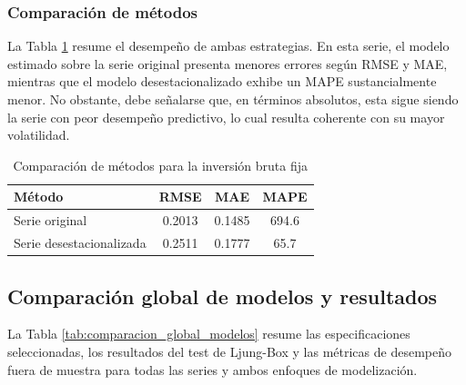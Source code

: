 \documentclass[12pt,a4paper]{article}
\begin{document}
	\subsubsection{Comparación de métodos}
	
	La Tabla \ref{tab:ibf_comparacion} resume el desempeño de ambas estrategias. En esta serie, el modelo estimado sobre la serie original presenta menores errores según RMSE y MAE, mientras que el modelo desestacionalizado exhibe un MAPE sustancialmente menor. No obstante, debe señalarse que, en términos absolutos, esta sigue siendo la serie con peor desempeño predictivo, lo cual resulta coherente con su mayor volatilidad.
	
	\begin{table}[H]
		\centering
		\caption{Comparación de métodos para la inversión bruta fija}
		\label{tab:ibf_comparacion}
		\begin{tabular}{lccc}
			\toprule
			Método & RMSE & MAE & MAPE \\
			\midrule
			Serie original & 0.2013 & 0.1485 & 694.6 \\
			Serie desestacionalizada & 0.2511 & 0.1777 & 65.7 \\
			\bottomrule
		\end{tabular}
	\end{table}
	
	\subsection{Comparación global de modelos y resultados}
	
	La Tabla \ref{tab:comparacion_global_modelos} resume las especificaciones seleccionadas, los resultados del test de Ljung-Box y las métricas de desempeño fuera de muestra para todas las series y ambos enfoques de modelización.
	
\end{document}
